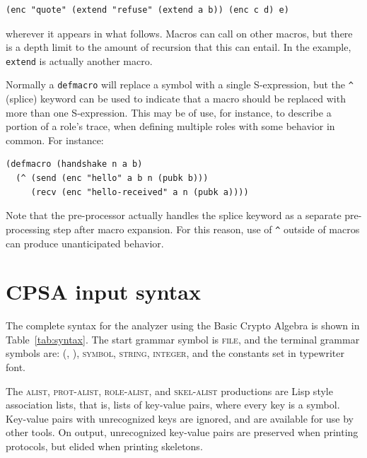 \begin{verbatim}
(enc "quote" (extend "refuse" (extend a b)) (enc c d) e)
\end{verbatim}

\noindent
wherever it appears in what follows.   Macros
can call on other macros, but there is a depth limit to the amount of
recursion that this can entail.  In the example, \texttt{extend} is
actually another macro.

 Normally a \texttt{defmacro} will
replace a symbol with a single S-expression, but the \texttt{\^}
(splice) keyword can be used to indicate that a macro should be
replaced with more than one S-expression.  This may be of use, for
instance, to describe a portion of a role's trace, when defining
multiple roles with some behavior in common.  For instance:

\begin{verbatim}
(defmacro (handshake n a b)
  (^ (send (enc "hello" a b n (pubk b)))
     (recv (enc "hello-received" a n (pubk a))))
\end{verbatim}

Note that the pre-processor actually handles the splice keyword as a
separate pre-processing step after macro expansion.  For this reason,
use of \texttt{\^} outside of macros can produce unanticipated behavior.

\section{CPSA input syntax}
\label{sec:input}

The complete syntax for the analyzer using the Basic Crypto Algebra is
shown in Table~\ref{tab:syntax}.  The start grammar symbol is
\textsc{file}, and the terminal grammar symbols are: \textsc{(, ),
  symbol, string, integer,} and the constants set in typewriter font.

The \textsc{alist}, \textsc{prot-alist}, \textsc{role-alist},
and \textsc{skel-alist} productions are Lisp style association lists,
that is, lists of key-value pairs, where every key is a symbol.
Key-value pairs with unrecognized keys are ignored, and are available
for use by other tools.  On output, unrecognized key-value pairs are
preserved when printing protocols, but elided when printing skeletons.

